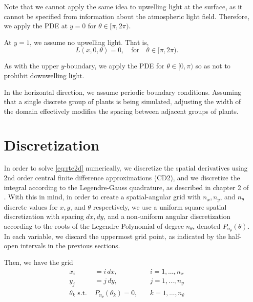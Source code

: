 \documentclass[10pt]{article}
\begin{document}
\begin{multicols}{2}
Note that we cannot apply the same idea to upwelling light at the surface, as it cannot be specified from information about the atmospheric light field.
Therefore, we apply the PDE at $y=0$ for $\theta \in [\pi,2\pi)$.

At $y=1$, we assume no upwelling light.
That is,
\begin{equation}
	L(x,0,\theta) = 0, \quad \mbox{for} \quad \theta \in [\pi,2\pi).
	\label{eq:surf_bc}
\end{equation}

As with the upper $y$-boundary, we apply the PDE for $\theta \in [0,\pi)$ so as not to prohibit downwelling light.

In the horizontal direction, we assume periodic boundary conditions.
Assuming that a single discrete group of plants is being simulated, adjusting the width of the domain effectively modifies the spacing between adjacent groups of plants.

\section{Discretization}
In order to solve \eqref{eq:rte2d} numerically, we discretize the spatial derivatives using 2nd order central finite difference approximations (CD2), and we discretize the integral according to the Legendre-Gauss quadrature, as described in chapter 2 of \citet{chandrasekhar_radiative_1960}.
With this in mind, in order to create a spatial-angular grid with $n_x,n_y$, and $n_\theta$ discrete values for $x, y$, and $\theta$ respectively, we use a uniform square spatial discretization with spacing $dx, dy$, and a non-uniform angular discretization according to the roots of the Legendre Polynomial of degree $n_\theta$, denoted $P_{n_\theta}(\theta)$.
In each variable, we discard the uppermost grid point, as indicated by the half-open intervals in the previous sections.

Then, we have the grid
\begin{align}
	x_i &= i\,dx, &\quad i=1,\ldots,n_x \\
	y_j &= j\,dy, &\quad j=1,\ldots,n_y \\
	\theta_k \,\, \mbox{s.t.}\,\, 
	&P_{n_\theta}(\theta_k) = 0, &\quad k=1,\ldots,n_\theta
\end{align}


\end{multicols}
\end{document}

